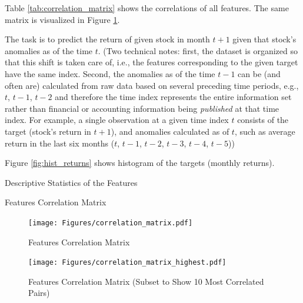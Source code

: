 	Table \ref{tab:correlation_matrix} shows the correlations of all features. The same matrix is visualized in Figure \ref{fig:correlation_matrix}. 

	The task is to predict the return of given stock in month $t+1$ given that stock's anomalies as of the time $t$. (Two technical notes: first, the dataset is organized so that this shift is taken care of, i.e., the features corresponding to the given target have the same index. Second, the anomalies as of the time $t-1$ can be (and often are) calculated from raw data based on several preceding time periods, e.g., $t$, $t-1$, $t-2$ and therefore the time index  represents the entire information set rather than financial or accounting information being \textit{published} at that time index. For example, a single observation at a given time index $t$ consists of the target (stock's return in $t+1$), and anomalies calculated as of $t$, such as average return in the last six months ($t$, $t-1$, $t-2$, $t-3$, $t-4$, $t-5$))
	
	Figure \ref{fig:hist_returns} shows histogram of the targets (monthly returns). 
	
	
	

	
	\begin{table}
		\resizebox{\textwidth}{!}{}
		\caption{Descriptive Statistics of the Features}
		\label{tab:descr}
	\end{table}

	\begin{table}
		\begin{adjustbox}{scale=0.4,center}
			
		\end{adjustbox}
		\caption{Features Correlation Matrix}
		\label{tab:correlation_matrix}
	\end{table}

	\begin{center}
		\begin{figure}
			\texttt{[image: Figures/correlation\_matrix.pdf]}
			\caption{Features Correlation Matrix}
			\label{fig:correlation_matrix}
		\end{figure}
	\end{center}
	
	\begin{center}
		\begin{figure}
			\texttt{[image: Figures/correlation\_matrix\_highest.pdf]}
			\caption{Features Correlation Matrix (Subset to Show 10 Most Correlated Pairs)}
			\label{fig:correlation_matrix_highest}
		\end{figure}
	\end{center}
	
